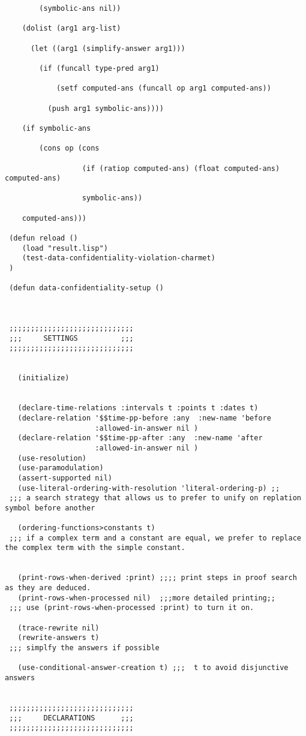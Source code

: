 \begin{lstlisting}
        (symbolic-ans nil))

    (dolist (arg1 arg-list)

      (let ((arg1 (simplify-answer arg1)))

        (if (funcall type-pred arg1)

            (setf computed-ans (funcall op arg1 computed-ans))

          (push arg1 symbolic-ans))))

    (if symbolic-ans

        (cons op (cons 

                  (if (ratiop computed-ans) (float computed-ans) computed-ans)

                  symbolic-ans))

	computed-ans)))

 (defun reload ()
    (load "result.lisp")
    (test-data-confidentiality-violation-charmet)
 )

 (defun data-confidentiality-setup ()

  

 ;;;;;;;;;;;;;;;;;;;;;;;;;;;;;
 ;;;     SETTINGS          ;;;
 ;;;;;;;;;;;;;;;;;;;;;;;;;;;;;

  
   (initialize)


   (declare-time-relations :intervals t :points t :dates t)
   (declare-relation '$$time-pp-before :any  :new-name 'before
                     :allowed-in-answer nil )
   (declare-relation '$$time-pp-after :any  :new-name 'after
                     :allowed-in-answer nil )
   (use-resolution)
   (use-paramodulation)
   (assert-supported nil)
   (use-literal-ordering-with-resolution 'literal-ordering-p) ;;
 ;;; a search strategy that allows us to prefer to unify on replation symbol before another

   (ordering-functions>constants t)
 ;;; if a complex term and a constant are equal, we prefer to replace the complex term with the simple constant.

  
   (print-rows-when-derived :print) ;;;; print steps in proof search as they are deduced.
   (print-rows-when-processed nil)  ;;;more detailed printing;;
 ;;; use (print-rows-when-processed :print) to turn it on.

   (trace-rewrite nil)
   (rewrite-answers t)
 ;;; simplfy the answers if possible

   (use-conditional-answer-creation t) ;;;  t to avoid disjunctive answers


 ;;;;;;;;;;;;;;;;;;;;;;;;;;;;;
 ;;;     DECLARATIONS      ;;;
 ;;;;;;;;;;;;;;;;;;;;;;;;;;;;;
  

\end{lstlisting}
